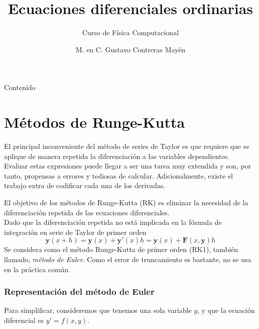

\title{Ecuaciones diferenciales ordinarias}
\subtitle{Curso de Física Computacional}
\author[]{M. en C. Gustavo Contreras Mayén}

\maketitle
\fontsize{14}{14}\selectfont
{}
\begin{frame}{Contenido}
\tableofcontents[pausesections]
\end{frame}
\section{Métodos de Runge-Kutta}
\begin{frame}
El principal inconveniente del método de series de Taylor es que requiere que se aplique de manera repetida la diferenciación a las variables dependientes.
\\
\medskip
Evaluar estas expresiones puede llegar a ser una tarea muy extendida y son, por tanto, propensas a errores y tediosas de calcular. Adicionalmente, existe el trabajo extra de codificar cada una de los derivadas.
\end{frame}
\begin{frame}
El objetivo de los métodos de Runge-Kutta (RK) es eliminar la necesidad de la diferenciación repetida de las ecuaciones diferenciales. 
\\
\medskip
Dado que la diferenciación repetida no está implicada en la fórmula de integración en serie de Taylor de primer orden
\[ \mathbf{y}(x+h) = \mathbf{y}(x) + \mathbf{y}'(x) h = \mathbf{y}(x) + \mathbf{F}(x,\mathbf{y}) h \]
Se considera como el método Runge-Kutta de primer orden (RK1), también llamado, \emph{método de Euler}. Como el error de truncamiento es bastante, no se usa en la práctica común.
\end{frame}
\begin{frame}
\frametitle{Representación del método de Euler}
\begin{center}
\end{center}
Para simplificar, consideremos que tenemos una sola variable $y$, y que la ecuación diferencial es $y'=f(x,y)$.
\end{frame}

